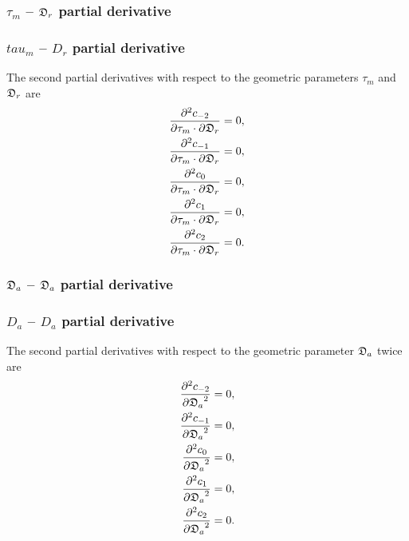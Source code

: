 \begin{latexonly}
    \subsubsection{$\tau_m$ -- $\mathfrak{D}_r$ partial derivative}
\end{latexonly}
\begin{htmlonly}
    \subsubsection{$tau_m$ -- $D_r$ partial derivative}
\end{htmlonly}

The second partial derivatives with respect to the geometric parameters $\tau_m$ and $\mathfrak{D}_r$ are
\begin{subequations}
\begin{align}
    \frac{\partial^2 c_{-2}}{\partial \tau_m \cdot \partial \mathfrak{D}_r}  &=  0, \\
    \frac{\partial^2 c_{-1}}{\partial \tau_m \cdot \partial \mathfrak{D}_r} &= 0, \\
    \frac{\partial^2 c_{0}}{\partial \tau_m \cdot \partial \mathfrak{D}_r}  &= 0, \\
    \frac{\partial^2 c_{1}}{\partial \tau_m \cdot \partial \mathfrak{D}_r}  &= 0, \\
    \frac{\partial^2 c_{2}}{\partial \tau_m \cdot \partial \mathfrak{D}_r}  &= 0.
\end{align}
\end{subequations}



\begin{latexonly}
    \subsubsection{$\mathfrak{D}_a$ -- $\mathfrak{D}_a$ partial derivative}
\end{latexonly}
\begin{htmlonly}
    \subsubsection{$D_a$ -- $D_a$ partial derivative}
\end{htmlonly}

The second partial derivatives with respect to the geometric parameter $\mathfrak{D}_a$ twice are
\begin{subequations}
\begin{align}
    \frac{\partial^2 c_{-2}}{{\partial \mathfrak{D}_a}^2}  &=  0, \\
    \frac{\partial^2 c_{-1}}{{\partial \mathfrak{D}_a}^2} &= 0, \\
    \frac{\partial^2 c_{0}}{{\partial \mathfrak{D}_a}^2}  &= 0, \\
    \frac{\partial^2 c_{1}}{{\partial \mathfrak{D}_a}^2}  &= 0, \\
    \frac{\partial^2 c_{2}}{{\partial \mathfrak{D}_a}^2}  &= 0.
\end{align}
\end{subequations}



